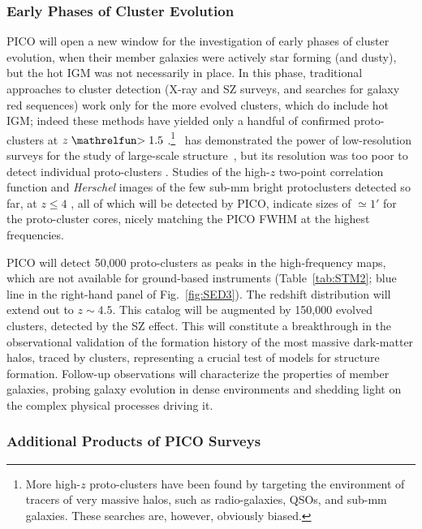 \documentclass[PICOReport.tex]{subfiles}
\begin{document}
\subsubsection{Early Phases of Cluster Evolution}

PICO will open a new window for the investigation of early phases of cluster evolution, when their member galaxies were actively star forming (and dusty), but the hot \ac{IGM} was not necessarily in place. In this phase, traditional approaches to cluster detection (X-ray and SZ surveys, and searches for galaxy red sequences) work only for the more evolved clusters, which do include hot \ac{IGM}; indeed these methods have yielded only a handful of confirmed proto-clusters at $z\simgt 1.5$ \cite{Overzier2016}.\footnote{More high-$z$ proto-clusters have been found by targeting the environment of tracers of very massive halos, such as radio-galaxies, QSOs, and sub-mm galaxies. These searches are, however, obviously biased.} \planck~has demonstrated the power of low-resolution surveys for the study of large-scale structure~\cite{Planck2016high_z}, but its resolution was too poor to detect individual proto-clusters \cite{Negrello2017protocl}.  Studies of the high-$z$ two-point correlation function \cite{Chen2016, Negrello2017protocl} and \textit{Herschel} images of the few sub-mm bright protoclusters detected so far, at $z \le 4$ \cite{Ivison2013, Wang2016, Oteo2018}, all of which will be detected by PICO, indicate sizes of $\simeq 1'$ for the proto-cluster cores, nicely matching the PICO FWHM at the highest frequencies.

PICO will detect 50,000 proto-clusters as peaks in the high-frequency maps, which are not available for ground-based instruments (Table~\ref{tab:STM2}; blue line in the right-hand panel of Fig.~\ref{fig:SED3}).
The redshift distribution will extend out to $z\sim4.5$. This catalog will be augmented by 150,000 evolved clusters, detected by the SZ effect. This will constitute a breakthrough in the observational validation of the formation history of the most massive dark-matter halos, traced by clusters, representing a crucial test of models for structure formation. Follow-up observations will characterize the properties of member galaxies, probing galaxy evolution in dense environments and shedding light on the complex physical processes driving it.

\subsubsection{Additional Products of PICO Surveys}
\end{document}
